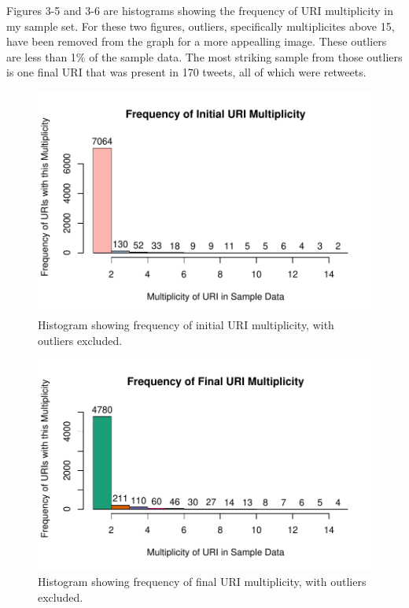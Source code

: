 \documentclass[a4paper,12pt]{article}
\begin{document}
Figures 3-5 and 3-6 are histograms showing the frequency of URI multiplicity in my sample set.
For these two figures, outliers, specifically multiplicites above 15, have been removed from the
graph for a more appealling image. These outliers are less than 1\% of the sample data. The most
striking sample from those outliers is one final URI that was present in 170 tweets, all of which
were retweets.
\begin{figure}[H]
    \centering
    \includegraphics{stats/frequency_initial_uri_multiplicity.pdf}
    \caption{Histogram showing frequency of initial URI multiplicity, with outliers excluded.}
\end{figure}
\begin{figure}[H]
    \centering
    \includegraphics{stats/frequency_final_uri_multiplicity.pdf}
    \caption{Histogram showing frequency of final URI multiplicity, with outliers excluded.}
\end{figure}
\end{document}
